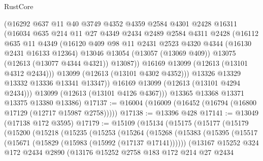 \begin{lexlean}{RustCore}
\begin{coremodule}
              (@16292
                @637
                @11
                @40
                @3749
                @4352
                @4359
                @2584
                @4301
                @2428
                @16311
                (@16034
                  @635
                  @214
                  @11
                  @27
                  @4349
                  @2434
                  @2489
                  @2584
                  @4311
                  @2428
                  (@16112
                    @635
                    @11
                    @4349
                    (@16120
                      @409
                      @98
                      @11
                      @2431
                      @2523
                      @4320
                      @4344
                      (@16130 @2431 @16133 @12364)
                      @13046
                      @13054
                      (@13057 (@13069 @409))
                      @13075
                      (@12613 (@13077 @4344 @4321))
                      @13087))
                  @16169
                  @13099
                  (@12613 (@13101 @4312 @2434)))
                @13099
                (@12613 (@13101 @4302 @4352)))
              @13326
              @13329
              @13332
              @13336
              @13341
              @13347))
          @16169
          @13099
          (@12613 (@13101 @4294 @2434)))
        @13099
        (@12613 (@13101 @4126 @4367)))
      @13365
      @13368
      @13371
      @13375
      @13380
      @13386)
@17137 := @16004 (@16009 (@16452 (@16794 (@16800 @17129 (@12717 @15987 @2758)))))
@17138 := @13396 @428
@17141 := @13049 (@17138 @172 @3595)
@17179 := @15109
    (@15134
      (@15175
        (@15177
          (@15179
            (@15200
              (@15218
                (@15235
                  (@15253
                    (@15264
                      (@15268
                        (@15383
                          (@15395
                            (@15517 (@15671 (@15829 (@15983 (@15992 (@17137 @17141))))))
                            (@13167
                              @15252
                              @324
                              @172
                              @2434
                              @2890
                              (@13176
                                @15252
                                @2758
                                @183
                                @172
                                @214
                                @27
                                @2434

\end{coremodule}
\end{lexlean}
